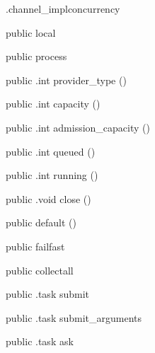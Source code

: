 \begin{CrexxClass}{.channel\_impl}{concurrency}

  \begin{Hierarchy}
  \end{Hierarchy}

  \begin{Members}

    \Factory
      {public}
      {local}
      {}

    \Factory
      {public}
      {process}
      {}

    \Method
      {public}
      {.int}
      {provider\_type}
      {()}

    \Method
      {public}
      {.int}
      {capacity}
      {()}

    \Method
      {public}
      {.int}
      {admission\_capacity}
      {()}

    \Method
      {public}
      {.int}
      {queued}
      {()}

    \Method
      {public}
      {.int}
      {running}
      {()}

    \Method
      {public}
      {.void}
      {close}
      {()}

    \Factory
      {public}
      {default}
      {()}

    \Factory
      {public}
      {failfast}
      {}

    \Factory
      {public}
      {collectall}
      {}

    \Method
      {public}
      {.task}
      {submit}
      {}

    \Method
      {public}
      {.task}
      {submit\_arguments}
      {}

    \Method
      {public}
      {.task}
      {ask}
      {}


\end{Members}
\end{CrexxClass}

